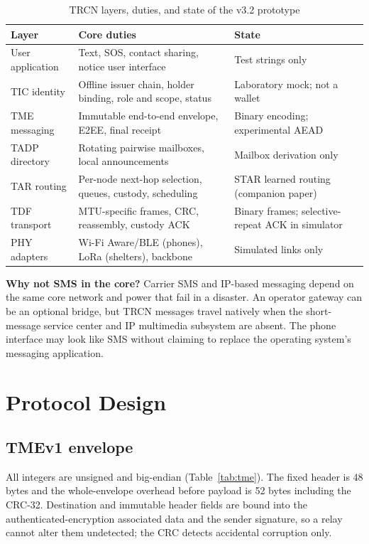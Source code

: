 \documentclass[jou,a4paper,11pt,floatsintext]{apa7}
\begin{document}
\begin{table}[t]
\caption{TRCN layers, duties, and state of the v3.2 prototype}
\label{tab:layers}
\small
\begin{tabularx}{\textwidth}{@{}lYY@{}}
\toprule
Layer & Core duties & State \\
\midrule
User application & Text, SOS, contact sharing, notice user interface & Test strings only \\
TIC identity & Offline issuer chain, holder binding, role and scope, status & Laboratory mock; not a wallet \\
TME messaging & Immutable end-to-end envelope, E2EE, final receipt & Binary encoding; experimental AEAD \\
TADP directory & Rotating pairwise mailboxes, local announcements & Mailbox derivation only \\
TAR routing & Per-node next-hop selection, queues, custody, scheduling & STAR learned routing (companion paper) \\
TDF transport & MTU-specific frames, CRC, reassembly, custody ACK & Binary frames; selective-repeat ACK in simulator \\
PHY adapters & Wi-Fi Aware/BLE (phones), LoRa (shelters), backbone & Simulated links only \\
\bottomrule
\end{tabularx}
\end{table}

\textbf{Why not SMS in the core?} Carrier SMS and IP-based messaging depend on the same core network and power that fail in a disaster. An operator gateway can be an optional bridge, but TRCN messages travel natively when the short-message service center and IP multimedia subsystem are absent. The phone interface may look like SMS without claiming to replace the operating system's messaging application.

\section{Protocol Design}
\label{sec:proto}

\subsection{TMEv1 envelope}
All integers are unsigned and big-endian (Table~\ref{tab:tme}). The fixed header is 48 bytes and the whole-envelope overhead before payload is 52 bytes including the CRC-32. Destination and immutable header fields are bound into the authenticated-encryption associated data and the sender signature, so a relay cannot alter them undetected; the CRC detects accidental corruption only.
\end{document}
